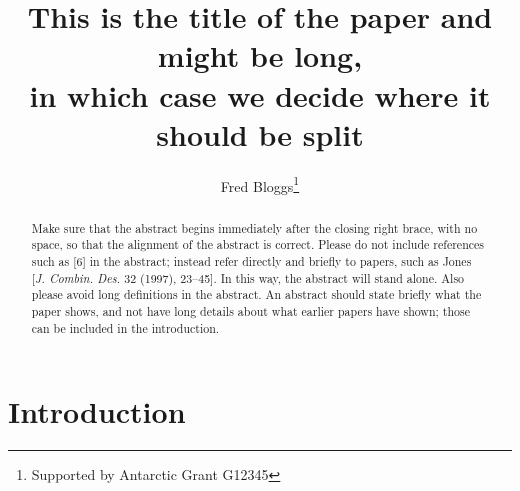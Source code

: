\documentclass[12pt]{article}
\numberwithin{equation}{section}
\begin{document}
\title{This is the title of the paper and might be long,\\
in which case we decide where it should be split}
\author{Fred Bloggs\thanks{Supported by Antarctic Grant G12345}}




\maketitle

\begin{abstract}Make sure that the abstract begins immediately after the closing right brace, 
with no space, so that the alignment of the abstract is correct. Please do not include
references such as [6] in the abstract; 
instead refer directly and briefly to papers, 
such as Jones [{\em J. Combin. Des.} 32 (1997), 23--45].
In this way, the abstract will stand alone.
Also please avoid long definitions in the abstract. 
An abstract should state briefly what the paper shows, 
and not have long details about what earlier papers have shown; 
those can be included in the introduction.
\end{abstract}

\section{Introduction}
\end{document}
